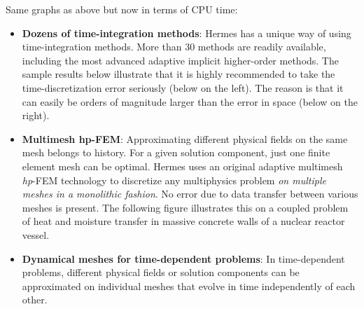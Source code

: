 \documentclass[a4paper,0pt,english]{sphinxmanual}
\let\origfigure=\figure
\renewenvironment{figure}[6]{
\origfigure[H]}
{\endlist}
\begin{document}
Same graphs as above but now in terms of CPU time:
\begin{figure}[htbp]
\centering

\end{figure}
\begin{itemize}
\item {} 
\textbf{Dozens of time-integration methods}: Hermes has a unique way of using time-integration methods. More than 30 methods are readily available, including the most advanced adaptive implicit higher-order methods. The sample results below illustrate that it is highly recommended to take the time-discretization error seriously (below on the left). The reason is that it can easily be orders of magnitude larger than the error in space (below on the right).

\end{itemize}
\begin{figure}[htbp]
\centering

\end{figure}
\begin{itemize}
\item {} 
\textbf{Multimesh hp-FEM}: Approximating different physical fields on the same mesh belongs to history. For a given solution component, just one finite element mesh can be optimal. Hermes uses an original adaptive multimesh \emph{hp}-FEM technology to discretize any multiphysics problem \emph{on multiple meshes in a monolithic fashion}. No error due to data transfer between various meshes is present. The following figure illustrates this on a coupled problem of heat and moisture transfer in massive concrete walls of a nuclear reactor vessel.

\end{itemize}
\begin{figure}[htbp]
\centering

\end{figure}
\begin{figure}[htbp]
\centering

\end{figure}
\begin{itemize}
\item {} 
\textbf{Dynamical meshes for time-dependent problems}: In time-dependent problems, different physical fields or solution components can be approximated on individual meshes that evolve in time independently of each other.

\end{itemize}
\end{document}
